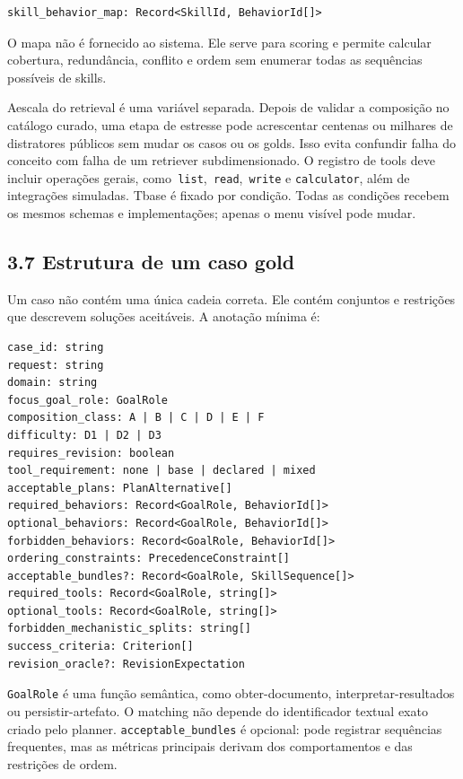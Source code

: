 \documentclass[12pt,a4paper]{article}
\begin{document}
\begin{Verbatim}[breaklines=true,breakanywhere=true,fontsize=\small]
skill_behavior_map: Record<SkillId, BehaviorId[]>
\end{Verbatim}

O mapa não é fornecido ao sistema. Ele serve para scoring e permite calcular cobertura, redundância, conflito e ordem sem enumerar todas as sequências possíveis de skills.



Aescala do retrieval é uma variável separada. Depois de validar a composição no catálogo curado, uma etapa de estresse pode acrescentar centenas ou milhares de distratores públicos sem mudar os casos ou os golds. Isso evita confundir falha do conceito com falha de um retriever subdimensionado. O registro de tools deve incluir operações gerais, como\texttt{ list},\texttt{ read},\texttt{ write} e \texttt{calculator}, além de integrações simuladas. Tbase é fixado por condição. Todas as condições recebem os mesmos schemas e implementações; apenas o menu visível pode mudar.


\subsection*{3.7 Estrutura de um caso gold}

Um caso não contém uma única cadeia correta. Ele contém conjuntos e restrições que descrevem soluções aceitáveis. A anotação mínima é:


\begin{Verbatim}[breaklines=true,breakanywhere=true,fontsize=\small]
case_id: string
request: string
domain: string
focus_goal_role: GoalRole
composition_class: A | B | C | D | E | F
difficulty: D1 | D2 | D3
requires_revision: boolean
tool_requirement: none | base | declared | mixed
acceptable_plans: PlanAlternative[]
required_behaviors: Record<GoalRole, BehaviorId[]>
optional_behaviors: Record<GoalRole, BehaviorId[]>
forbidden_behaviors: Record<GoalRole, BehaviorId[]>
ordering_constraints: PrecedenceConstraint[]
acceptable_bundles?: Record<GoalRole, SkillSequence[]>
required_tools: Record<GoalRole, string[]>
optional_tools: Record<GoalRole, string[]>
forbidden_mechanistic_splits: string[]
success_criteria: Criterion[]
revision_oracle?: RevisionExpectation
\end{Verbatim}

\texttt{GoalRole} é uma função semântica, como obter-documento, interpretar-resultados ou persistir-artefato. O matching não depende do identificador textual exato criado pelo planner. \texttt{acceptable\_bundles} é opcional: pode registrar sequências frequentes, mas as métricas principais derivam dos comportamentos e das restrições de ordem.
\end{document}
